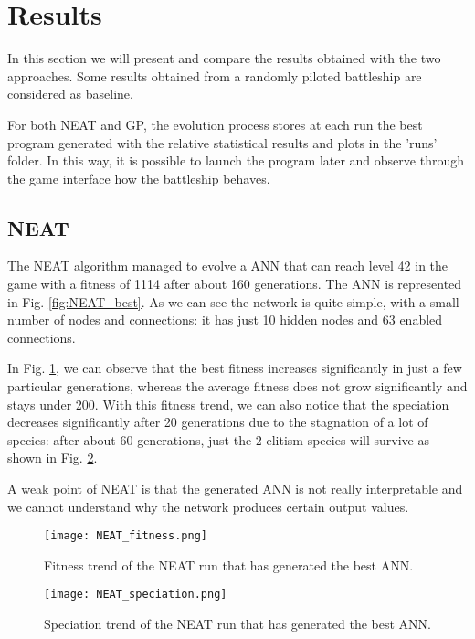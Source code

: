 \section{Results}
In this section we will present and compare the results obtained with the two approaches. 
Some results obtained from a randomly piloted battleship are considered as baseline.

For both NEAT and GP, the evolution process stores at each run the best program generated with the
relative statistical results and plots in the 'runs' folder. In this way, it is
possible to launch the program later and observe through the game interface how the battleship behaves.


\subsection{NEAT}
The NEAT algorithm managed to evolve a ANN that can reach level 42 in the game with a
fitness of 1114 after about 160 generations. The ANN is represented in Fig. \ref{fig:NEAT_best}. As we can
see the network is quite simple, with a small number of nodes and connections: it has just 10
hidden nodes and 63 enabled connections.


In Fig. \ref{fig:NEAT_fitness}, we can observe that the best fitness increases significantly in just a few particular
generations, whereas the average fitness does not grow significantly and stays under 200.
With this fitness trend, we can also notice that the speciation decreases significantly after 20
generations due to the stagnation of a lot of species: after about 60 generations, 
just the 2 elitism species will survive as shown in Fig. \ref{fig:NEAT_speciation}.

A weak point of NEAT is that the generated ANN is not really interpretable and we cannot
understand why the network produces certain output values.

\begin{figure}[ht]
\centerline{\texttt{[image: NEAT\_fitness.png]}}
\caption{Fitness trend of the NEAT run that has generated the best ANN.}
\label{fig:NEAT_fitness}
\end{figure}


\begin{figure}[ht]
\centerline{\texttt{[image: NEAT\_speciation.png]}}
\caption{Speciation trend of the NEAT run that has generated the best ANN.}
\label{fig:NEAT_speciation}
\end{figure}


